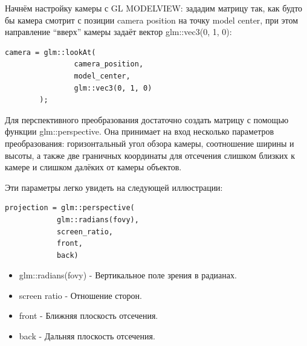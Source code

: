 \documentclass[14pt,a4paper,report]{report}
\begin{document}
Начнём настройку камеры с GL MODELVIEW: зададим матрицу так, как будто бы камера смотрит с позиции camera position на точку model center, при этом направление “вверх” камеры задаёт вектор glm::vec3(0, 1, 0):

\begin{lstlisting}
camera = glm::lookAt(
                camera_position,
                model_center,
                glm::vec3(0, 1, 0)
        );
\end{lstlisting}

Для перспективного преобразования достаточно создать матрицу с помощью функции glm::perspective. Она принимает на вход несколько  параметров преобразования: горизонтальный угол обзора камеры, соотношение ширины и высоты, а также две граничных координаты для отсечения слишком близких к камере и слишком далёких от камеры объектов. 

Эти параметры легко увидеть на следующей иллюстрации:

\begin{figure}[h!]
\label{ris:image}
\end{figure}

\clearpage
\begin{lstlisting}
projection = glm::perspective(
            glm::radians(fovy),
            screen_ratio,
            front,
            back)
\end{lstlisting}

\begin{itemize}
\item glm::radians(fovy) - Вертикальное поле зрения в радианах.

\item screen ratio - Отношение сторон.

\item front - Ближняя плоскость отсечения.

\item back - Дальняя плоскость отсечения.

\end{itemize}
\end{document}
